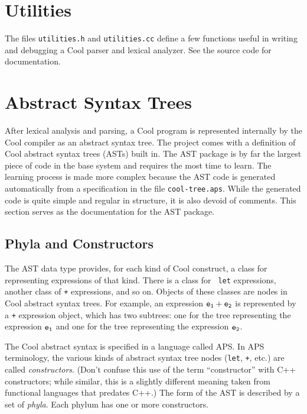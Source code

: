 \section{Utilities}

The files {\tt utilities.h} and {\tt utilities.cc} define a few
functions useful in writing and debugging a Cool parser and lexical
analyzer.  See the source code for documentation.

\section{Abstract Syntax Trees}

After lexical analysis and parsing, a Cool program is represented
internally by the Cool compiler as an abstract syntax tree.  The
project comes with a definition of Cool abstract syntax trees (ASTs)
built in.  The AST package is by far the largest piece of code in the
base system and requires the most time to learn.  The learning process
is made more complex because the AST code is generated automatically
from a specification in the file {\tt cool-tree.aps}.  While the
generated code is quite simple and regular in structure, it is also
devoid of comments.  This section serves as the documentation for the
AST package.


\subsection{Phyla and Constructors}

The AST data type provides, for each kind of Cool construct, a class
for representing expressions of that kind.  There is a class for {\tt
let} expressions, another class of {\tt +} expressions, and so on.
Objects of these classes are nodes in Cool abstract syntax trees.
For example, an expression $\tt e_1 + e_2$ is represented by a {\tt +}
expression object, which has two subtrees: one for the tree representing 
the expression $\tt e_1$ and one for the tree representing the
expression $\tt e_2$.

The Cool abstract syntax is specified in a language called APS.
In APS terminology, the various kinds of abstract syntax tree nodes
({\tt let}, {\tt +}, etc.) are called {\em constructors}.  (Don't
confuse this use of the term ``constructor'' with C++ constructors;
while similar, this is a slightly different meaning taken from
functional languages that predates C++.)  The form of the AST
is described by a set of {\it phyla}.  Each phylum has one or more
constructors.

